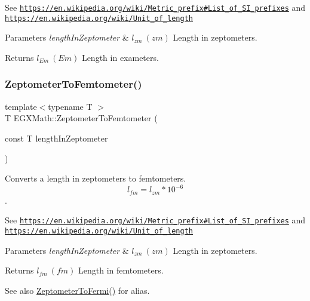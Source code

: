 See \href{https://en.wikipedia.org/wiki/Metric_prefix#List_of_SI_prefixes}{\tt https\+://en.\+wikipedia.\+org/wiki/\+Metric\+\_\+prefix\#\+List\+\_\+of\+\_\+\+S\+I\+\_\+prefixes} and \href{https://en.wikipedia.org/wiki/Unit_of_length}{\tt https\+://en.\+wikipedia.\+org/wiki/\+Unit\+\_\+of\+\_\+length} 
\begin{DoxyParams}{Parameters}
{\em length\+In\+Zeptometer} & $ l_{zm}\ (zm)$ Length in zeptometers. \\
\hline
\end{DoxyParams}
\begin{DoxyReturn}{Returns}
$ l_{Em}\ (Em)$ Length in exameters. 
\end{DoxyReturn}
\mbox{\label{group___e_g_x_math-_conversions-_length_conversions-_s_i-_zeptometer-_s_i_ga8975921335cca63259a2c02edfb39c00}} 
\subsubsection{\texorpdfstring{Zeptometer\+To\+Femtometer()}{ZeptometerToFemtometer()}}
{\footnotesize\ttfamily template$<$typename T $>$ \\
T E\+G\+X\+Math\+::\+Zeptometer\+To\+Femtometer (\begin{DoxyParamCaption}\item[{const T}]{length\+In\+Zeptometer }\end{DoxyParamCaption})}



Converts a length in zeptometers to femtometers. \[ l_{fm}=l_{zm} * 10^{-6} \]. 

See \href{https://en.wikipedia.org/wiki/Metric_prefix#List_of_SI_prefixes}{\tt https\+://en.\+wikipedia.\+org/wiki/\+Metric\+\_\+prefix\#\+List\+\_\+of\+\_\+\+S\+I\+\_\+prefixes} and \href{https://en.wikipedia.org/wiki/Unit_of_length}{\tt https\+://en.\+wikipedia.\+org/wiki/\+Unit\+\_\+of\+\_\+length} 
\begin{DoxyParams}{Parameters}
{\em length\+In\+Zeptometer} & $ l_{zm}\ (zm)$ Length in zeptometers. \\
\hline
\end{DoxyParams}
\begin{DoxyReturn}{Returns}
$ l_{fm}\ (fm)$ Length in femtometers. 
\end{DoxyReturn}
\begin{DoxySeeAlso}{See also}
\mbox{\hyperlink{group___e_g_x_math-_conversions-_length_conversions-_s_i-_zeptometer-_non-_s_i_ga15c5cde158a9916cc01d998c7abc38c4}{Zeptometer\+To\+Fermi()}} for alias. 
\end{DoxySeeAlso}
\mbox{\label{group___e_g_x_math-_conversions-_length_conversions-_s_i-_zeptometer-_s_i_ga730e0331ec8efc46b557692f5f515d03}} 
